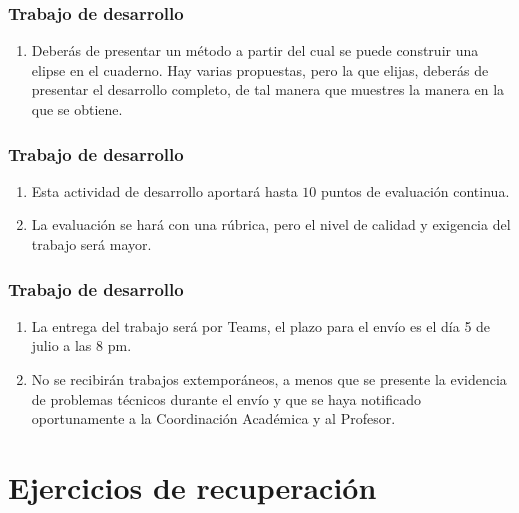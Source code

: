 \documentclass[14pt]{beamer}
\begin{document}
\begin{frame}
\frametitle{Trabajo de desarrollo}
\begin{enumerate}[<+->]
\conti
\item Deberás de presentar un método a partir del cual se puede construir una elipse en el cuaderno. Hay varias propuestas, pero la que elijas, deberás de presentar el desarrollo completo, de tal manera que muestres la manera en la que se obtiene.
\seti
\end{enumerate}
\end{frame}
\begin{frame}
\frametitle{Trabajo de desarrollo}
\begin{enumerate}[<+->]
\conti
\item Esta actividad de desarrollo aportará hasta $10$ puntos de evaluación continua.
\item La evaluación se hará con una rúbrica, pero el nivel de calidad y exigencia del trabajo será mayor.
\seti
\end{enumerate}
\end{frame}
\begin{frame}
\frametitle{Trabajo de desarrollo}
\begin{enumerate}[<+->]
\conti
\item La entrega del trabajo será por Teams, el plazo para el envío es el día 5 de julio a las 8 pm.
\item No se recibirán trabajos extemporáneos, a menos que se presente la evidencia de problemas técnicos durante el envío y que se haya notificado oportunamente a la Coordinación Académica y al Profesor.
\end{enumerate}
\end{frame}

\section{Ejercicios de recuperación}
\end{document}
